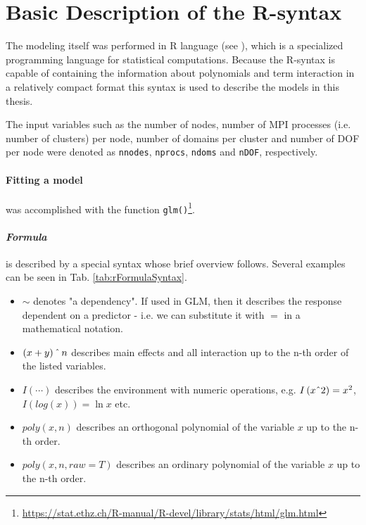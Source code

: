 \section{Basic Description of the R-syntax}
\label{sec:r}
The modeling itself was performed in R language (see \cite{rDocs}), which is
a specialized programming language for statistical computations. Because the R-syntax is
capable of containing the information about polynomials and term interaction in a 
relatively compact format this syntax is used to describe the models in this thesis.


The input variables such as the number of nodes, number of MPI processes (i.e. number of clusters) per 
node, number of domains per cluster and number of DOF per node were denoted as 
\texttt{nnodes}, \texttt{nprocs}, \texttt{ndoms} and \texttt{nDOF}, respectively.


\paragraph*{Fitting a model} was accomplished with the function \texttt{glm()}\footnote{\url{https://stat.ethz.ch/R-manual/R-devel/library/stats/html/glm.html}}.




\paragraph*{\textit{Formula}} is described by a special syntax whose brief overview follows. Several examples can be seen in  Tab. \ref{tab:rFormulaSyntax}.

\begin{itemize}
	\item[]$\sim$ denotes "a dependency". If used in GLM, then it describes the response dependent on
	a predictor - i.e. we can substitute it with $=$ in a mathematical notation.
	\item[]$\left(x + y\right)\string^\,n$ describes main effects and all interaction up to the 
	n-th order of the listed variables.
	\item[]$I\left( \cdots \right)$ describes the environment with numeric operations, e.g. $I\left( x\string^2 \right) = x^2$, $I\left( log\left(x\right) \right) = \ln x$ etc.
	\item[]$poly\left(x, n\right)$ describes an orthogonal polynomial of the variable $x$ up to the n-th
	order.
	\item[]$poly\left(x, n, raw=T\right)$ describes an ordinary polynomial of the variable $x$ up to the 
	n-th order.
\end{itemize}


